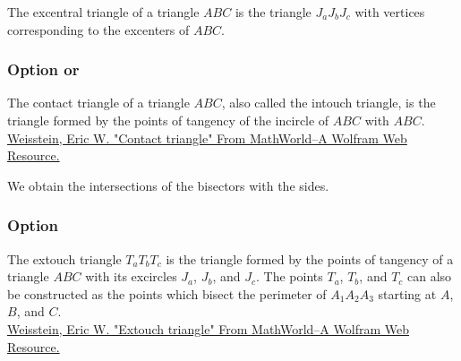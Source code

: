 The excentral triangle of a triangle $ABC$ is the triangle $J_aJ_bJ_c$ with vertices corresponding to the excenters of $ABC$.

\begin{tkzexample}[latex=7cm,small]
\end{tkzexample}


\subsubsection{Option  or }
The contact triangle of a triangle $ABC$, also called the intouch triangle, is the triangle  formed by the points of tangency of the incircle of $ABC$ with $ABC$.\\
\href{http://mathworld.wolfram.com/ContactTriangle.html}{Weisstein, Eric W. "Contact triangle" From MathWorld--A Wolfram Web Resource.}

We obtain the intersections of the bisectors with the sides.
\begin{tkzexample}[latex=7cm,small]
\end{tkzexample}

\subsubsection{Option }
The extouch triangle  $T_aT_bT_c$ is the triangle formed by the points of tangency of a triangle $ABC$ with its excircles $J_a$, $J_b$, and $J_c$. The points  $T_a$, $T_b$, and $T_c$ can also be constructed as the points which bisect the perimeter of $A_1A_2A_3$ starting at $A$, $B$, and $C$.\\
\href{http://mathworld.wolfram.com/ExtouchTriangle.html}{Weisstein, Eric W. "Extouch triangle" From MathWorld--A Wolfram Web Resource.}

